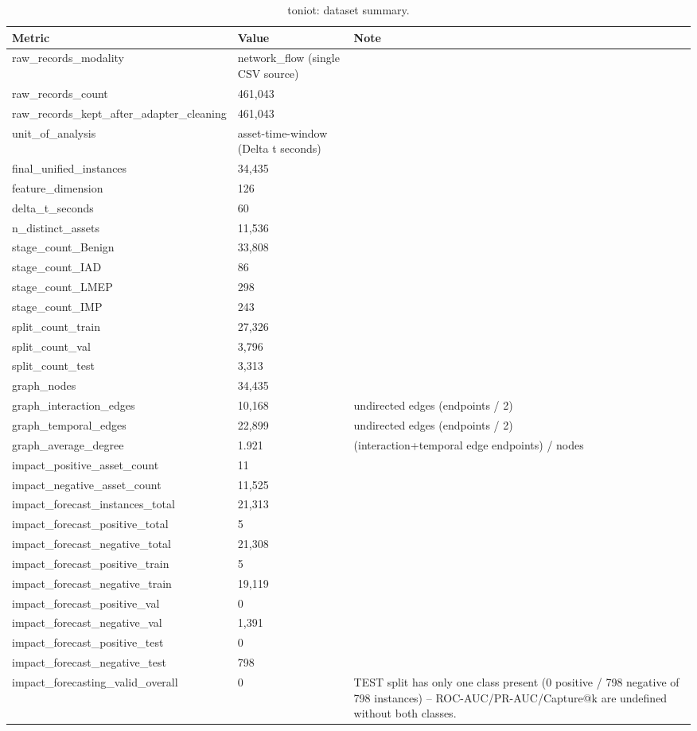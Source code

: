 \begin{table}[t]
\centering
\caption{toniot: dataset summary.}
\label{tab:toniot_dataset_summary}
\begin{tabular}{lll}
\toprule
Metric & Value & Note \\
\midrule
raw\_records\_modality & network\_flow (single CSV source) &  \\
raw\_records\_count & 461,043 &  \\
raw\_records\_kept\_after\_adapter\_cleaning & 461,043 &  \\
unit\_of\_analysis & asset-time-window (Delta t seconds) &  \\
final\_unified\_instances & 34,435 &  \\
feature\_dimension & 126 &  \\
delta\_t\_seconds & 60 &  \\
n\_distinct\_assets & 11,536 &  \\
stage\_count\_Benign & 33,808 &  \\
stage\_count\_IAD & 86 &  \\
stage\_count\_LMEP & 298 &  \\
stage\_count\_IMP & 243 &  \\
split\_count\_train & 27,326 &  \\
split\_count\_val & 3,796 &  \\
split\_count\_test & 3,313 &  \\
graph\_nodes & 34,435 &  \\
graph\_interaction\_edges & 10,168 & undirected edges (endpoints / 2) \\
graph\_temporal\_edges & 22,899 & undirected edges (endpoints / 2) \\
graph\_average\_degree & 1.921 & (interaction+temporal edge endpoints) / nodes \\
impact\_positive\_asset\_count & 11 &  \\
impact\_negative\_asset\_count & 11,525 &  \\
impact\_forecast\_instances\_total & 21,313 &  \\
impact\_forecast\_positive\_total & 5 &  \\
impact\_forecast\_negative\_total & 21,308 &  \\
impact\_forecast\_positive\_train & 5 &  \\
impact\_forecast\_negative\_train & 19,119 &  \\
impact\_forecast\_positive\_val & 0 &  \\
impact\_forecast\_negative\_val & 1,391 &  \\
impact\_forecast\_positive\_test & 0 &  \\
impact\_forecast\_negative\_test & 798 &  \\
impact\_forecasting\_valid\_overall & 0 & TEST split has only one class present (0 positive / 798 negative of 798 instances) -- ROC-AUC/PR-AUC/Capture@k are undefined without both classes. \\
\bottomrule
\end{tabular}
\end{table}
